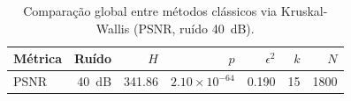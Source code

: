 \begin{table}[htbp]
\centering
\caption{Comparação global entre métodos clássicos via Kruskal-Wallis (\gls{PSNR}, ruído 40~dB).}
\label{tab:kruskal}
\footnotesize
\begin{tabular}{lrrrrrr}
\toprule
Métrica & Ruído & $H$ & $p$ & $\epsilon^2$ & $k$ & $N$ \\
\midrule
\gls{PSNR} & 40~dB & 341.86 & $2.10\times10^{-64}$ & 0.190 & 15 & 1800 \\
\bottomrule
\end{tabular}
\end{table}
